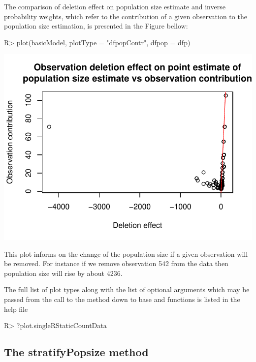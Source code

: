 \documentclass[
]{jss}
\newcommand{\1}{\mathcal{I}} \newcommand{\bZero}{\boldsymbol{0}}
\begin{document}
The comparison of deletion effect on population size estimate and
inverse probability weights, which refer to the contribution of a given
observation to the population size estimation, is presented in the
Figure bellow:

\begin{CodeChunk}
\begin{CodeInput}
R> plot(basicModel, plotType = "dfpopContr", dfpop = dfp)
\end{CodeInput}


\begin{center}\includegraphics{singleRcapture_files/figure-latex/dfpopsize_plot-1} \end{center}

\end{CodeChunk}

This plot informs on the change of the population size if a given
observation will be removed. For instance if we remove observation 542
from the data then population size will rise by about 4236.

The full list of plot types along with the list of optional arguments
which may be passed from the call to the  method down to base
 and  functions is listed in the help file

\begin{CodeChunk}
\begin{CodeInput}
R> ?plot.singleRStaticCountData
\end{CodeInput}
\end{CodeChunk}

\subsection{The stratifyPopsize
method}\label{the-stratifypopsize-method}
\end{document}
